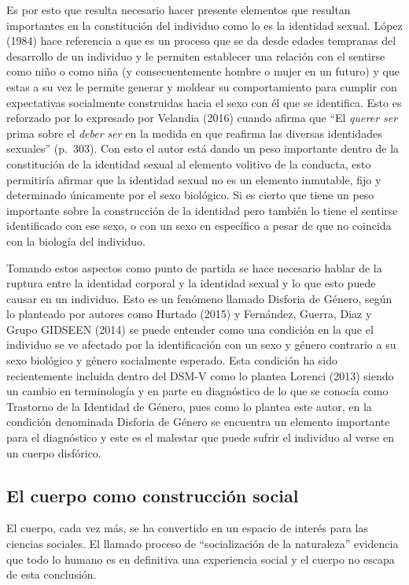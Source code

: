 Es por esto que resulta necesario hacer presente elementos que resultan
importantes en la constitución del individuo como lo es la identidad sexual.
López (1984) hace referencia a que es un proceso que se da desde edades
tempranas del desarrollo de un individuo y le permiten establecer una relación
con el sentirse como niño o como niña (y consecuentemente hombre o mujer
en un futuro) y que estas a su vez le permite generar y moldear su
comportamiento para cumplir con expectativas socialmente construidas hacia el
sexo con él que se identifica.
Esto es reforzado por lo expresado por Velandia (2016) cuando afirma que “El
\emph{querer ser} prima sobre el \emph{deber ser} en la medida en que
reafirma las diversas identidades sexuales” (p.~303).
Con esto el autor está dando un peso importante dentro de la constitución de la
identidad sexual al elemento volitivo de la conducta, esto permitiría afirmar
que la identidad sexual no es un elemento inmutable, fijo y determinado
únicamente por el sexo biológico.
Si es cierto que tiene un peso importante sobre la construcción de la identidad
pero también lo tiene el sentirse identificado con ese sexo, o con un sexo en
específico a pesar de que no coincida con la biología del individuo.

Tomando estos aspectos como punto de partida se hace necesario hablar de la
ruptura entre la identidad corporal y la identidad sexual y lo que esto puede
causar en un individuo.
Esto es un fenómeno llamado Disforia de Género, según lo planteado por autores
como Hurtado (2015) y Fernández, Guerra, Diaz y Grupo GIDSEEN (2014) se puede
entender como una condición en la que el individuo se ve afectado por la
identificación con un sexo y género contrario a su sexo biológico y género
socialmente esperado.
Esta condición ha sido recientemente incluida dentro del DSM-V como lo plantea
Lorenci (2013) siendo un cambio en terminología y en parte en diagnóstico de lo
que se conocía como Trastorno de la Identidad de Género, pues como lo plantea
este autor, en la condición denominada Disforia de Género se encuentra un
elemento importante para el diagnóstico y este es el malestar que puede sufrir
el individuo al verse en un cuerpo disfórico.

\subsection{El cuerpo como construcción social}
El cuerpo, cada vez más, se ha convertido en un espacio de interés para las
ciencias sociales.
El llamado proceso de “socialización de la naturaleza” evidencia que todo lo
humano es en definitiva una experiencia social y el cuerpo no escapa de esta
conclusión.

